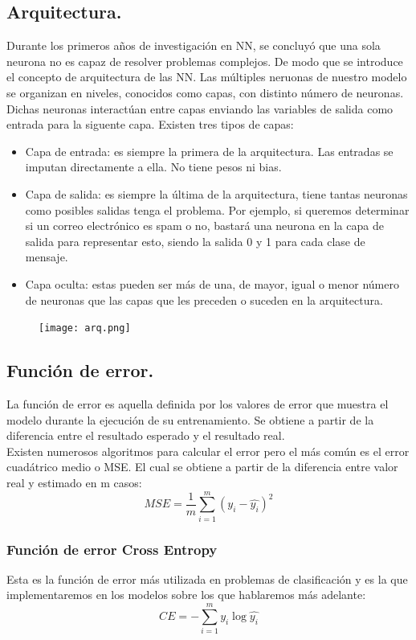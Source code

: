 \documentclass[a4paper,10pt]{article}
\begin{document}
\subsection{Arquitectura.}
Durante los primeros años de investigación en NN, se concluyó que una sola neurona no es capaz de resolver problemas complejos. De modo que se introduce el concepto de arquitectura de las NN. Las múltiples neruonas de nuestro modelo se organizan en niveles, conocidos como capas, con distinto número de neuronas. Dichas neuronas interactúan entre capas enviando las variables de salida como entrada para la siguente capa.
Existen tres tipos de capas:
\begin{itemize}
    \item Capa de entrada: es siempre la primera de la arquitectura. Las entradas se imputan directamente a ella. No tiene pesos ni bias.
    \item Capa de salida: es siempre la última de la arquitectura, tiene tantas neuronas como posibles salidas tenga el problema. Por ejemplo, si queremos determinar si un correo electrónico es spam o no, bastará una neurona en la capa de salida para representar esto, siendo la salida 0 y 1 para cada clase de mensaje. 
    \item Capa oculta: estas pueden ser más de una, de mayor, igual o menor número de neuronas que las capas que les preceden o suceden en la arquitectura.
\end{itemize} 
\begin{figure}[H]
\centering
\texttt{[image: arq.png]}
\end{figure}
\subsection{Función de error.}
La función de error es aquella definida por los valores de error que muestra el modelo durante la ejecución de su entrenamiento. Se obtiene a partir de la diferencia entre el resultado esperado y el resultado real.\\ Existen numerosos algoritmos para calcular el error pero el más común es el error cuadátrico medio o MSE. El cual se obtiene a partir de la diferencia entre valor real y estimado en m casos:
\[
MSE=\frac{1}{m}\sum_{i=1}^m (y_i - \hat{y_i})^2
\]
\subsubsection{Función de error Cross Entropy}
Esta es la función de error más utilizada en problemas de clasificación y es la que implementaremos en los modelos sobre los que hablaremos más adelante: 
\[
CE=-\sum_{i=1}^m y_i \log\hat{y_i}
\]
\end{document}
